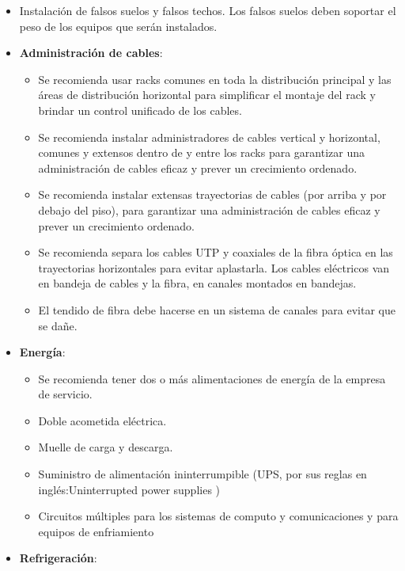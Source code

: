\begin{itemize}
\begin{itemize}
        \end{itemize}
        \item Instalación de falsos suelos y falsos techos. Los falsos suelos deben soportar el peso de los equipos que serán instalados.
        \item \textbf{Administración de cables}:
            \begin{itemize}
                    \item Se recomienda usar racks comunes en toda la distribución principal y las áreas de distribución horizontal para simplificar el montaje del rack y brindar un control unificado de los cables.
                    \item Se recomienda instalar administradores de cables vertical y horizontal, comunes y extensos dentro de y entre los racks para garantizar una administración de cables eficaz y prever un crecimiento ordenado.
                    \item Se recomienda instalar extensas trayectorias de cables (por arriba y por debajo del piso), para garantizar una administración de cables eficaz y prever un crecimiento ordenado.
                    \item Se recomienda separa los cables UTP y coaxiales de la fibra óptica en las trayectorias horizontales para evitar aplastarla. Los cables eléctricos van en bandeja de cables y la fibra, en canales montados en bandejas.
                    \item El tendido de fibra debe hacerse en un sistema de canales para evitar que se dañe.
            \end{itemize}
         \item  \textbf{Energía}:
            \begin{itemize}
	            \item Se recomienda tener dos o más alimentaciones de energía de la empresa de servicio.
                \item Doble acometida eléctrica.
                \item Muelle de carga y descarga.
                \item Suministro de alimentación ininterrumpible (UPS, por sus reglas en inglés:Uninterrupted power supplies )
                \item Circuitos múltiples para los sistemas de computo y comunicaciones y para equipos de enfriamiento
            \end{itemize}
          \item \textbf{Refrigeración}:           

\end{itemize}
